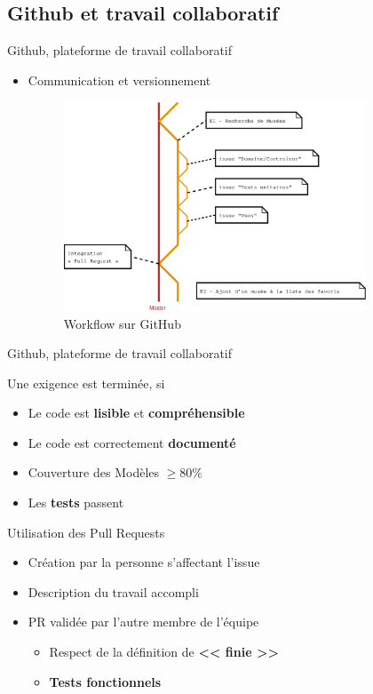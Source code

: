 \AntoineSpeak	
\subsection{Github  et travail collaboratif}	%
\begin{frame}{Github, plateforme de travail collaboratif} %
	\begin{itemize}
		\item Communication et versionnement
		\begin{figure}
			\centering
			\includegraphics[width=9cm]{./images/workflow_github}
			\caption{Workflow sur GitHub}
			\label{fig:workflow_github}
		\end{figure}
	\end{itemize}
\end{frame}

\begin{frame}{Github, plateforme de travail collaboratif} %
	\begin{block}{Une exigence est terminée, si}
		\begin{itemize}
			\item Le code est \textbf{lisible} et \textbf{compréhensible}
			\item Le code est correctement \textbf{documenté}
			\item Couverture des Modèles $\geq 80\%$
			\item Les \textbf{tests} passent \cmark
		\end{itemize} 
	\end{block}
	\pause

	\begin{block}{Utilisation des Pull Requests}
		\begin{itemize}
			\item Création par la personne s'affectant l'issue
			\item Description du travail accompli
			\item PR validée par l'autre membre de l'équipe
				\begin{itemize}
					\item Respect de la définition de \textbf{<< finie >>}
					\item \textbf{Tests fonctionnels} \cmark
				\end{itemize}
		\end{itemize}
	\end{block}
\end{frame}

